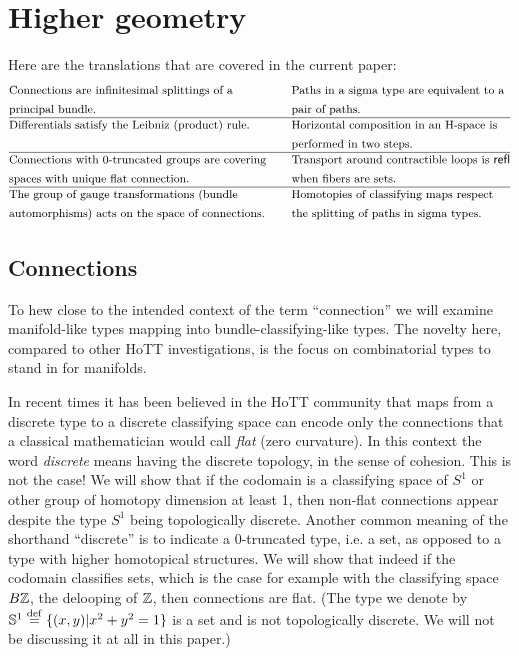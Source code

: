 \section{Higher geometry}

Here are the translations that are covered in the current paper:
\begin{align*}
& \text{\small Connections are infinitesimal splittings of a} & \quad &\text{\small Paths in a sigma type are equivalent to a}        \\
& \text{\small principal bundle.} & \quad&\text{\small pair of paths.}        \\ \hline
& \text{\small Differentials satisfy the Leibniz (product) rule.} &\quad  &\text{\small Horizontal composition in an H-space is} \\ 
&  &  \quad&\text{\small performed in two steps.} \\ \hline
& \text{\small Connections with 0-truncated groups are covering}        &\quad &\text{\small Transport around contractible loops is } \mathsf{refl}             \\ 
& \text{\small spaces with unique flat connection.}        & \quad&\text{\small when fibers are sets.}             \\ \hline
& \text{\small The group of gauge transformations (bundle} &\quad &\text{\small Homotopies of classifying maps respect } \\ 
& \text{\small automorphisms) acts on the space of connections.} & \quad&\text{\small the splitting of paths in sigma types.} \\ 
\end{align*}

\subsection{Connections}

To hew close to the intended context of the term ``connection'' we will examine manifold-like types mapping into bundle-classifying-like types. The novelty here, compared to other HoTT investigations, is the focus on combinatorial types to stand in for manifolds.

In recent times it has been believed in the HoTT community that maps from a discrete type to a discrete classifying space can encode only the connections that a classical mathematician would call \emph{flat} (zero curvature). In this context the word \emph{discrete} means having the discrete topology, in the sense of cohesion\cite{shulman_cohesion}. This is not the case! We will show that if the codomain is a classifying space of \( S^1 \) or other group of homotopy dimension at least 1, then non-flat connections appear despite the type \( S^1 \) being topologically discrete. Another common meaning of the shorthand ``discrete'' is to indicate a 0-truncated type, i.e. a set, as opposed to a type with higher homotopical structures. We will show that indeed if the codomain classifies sets, which is the case for example with the classifying space \( B\mathbb{Z} \), the delooping of \( \mathbb{Z} \), then connections are flat. (The type we denote by \( \mathbb{S}^1\stackrel{\mathrm{def}}{=}\{(x, y)|x^2+y^2=1\} \) is a set and is not topologically discrete. We will not be discussing it at all in this paper.)

